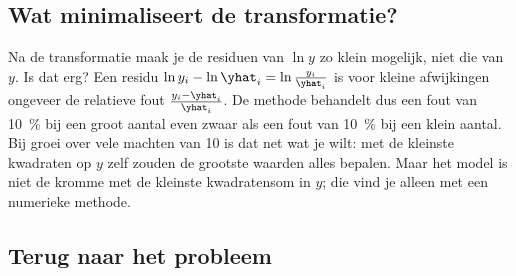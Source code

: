 \subsection{Wat minimaliseert de transformatie?}

Na de transformatie maak je de residuen van $\ln y$ zo klein mogelijk, niet die van $y$. Is dat erg? Een residu $\ln y_i - \ln \yhat_i = \ln \frac{y_i}{\yhat_i}$ is voor kleine afwijkingen ongeveer de relatieve fout $\frac{y_i - \yhat_i}{\yhat_i}$. De methode behandelt dus een fout van 10~\% bij een groot aantal even zwaar als een fout van 10~\% bij een klein aantal. Bij groei over vele machten van 10 is dat net wat je wilt: met de kleinste kwadraten op $y$ zelf zouden de grootste waarden alles bepalen. Maar het model is niet de kromme met de kleinste kwadratensom in $y$; die vind je alleen met een numerieke methode.


\begin{oefeningen}
\end{oefeningen}

\subsection{Terug naar het probleem}

